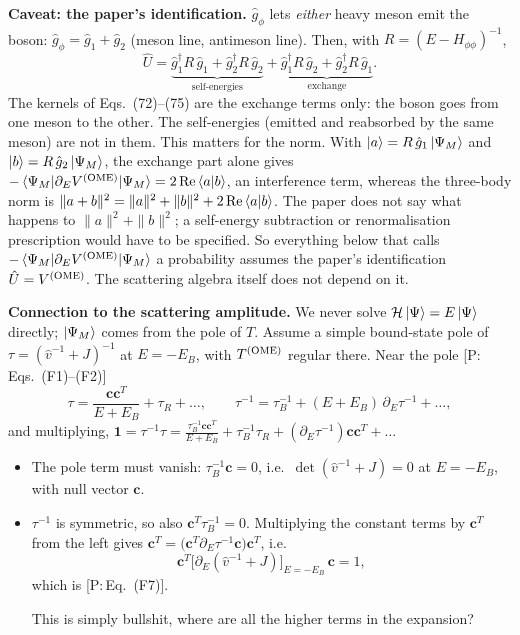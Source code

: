 \documentclass[11pt,a4paper]{article}
\newcommand{\tagP}[1]{\textcolor{blue!65!black}{\textsf{\small[P:\,#1]}}}
\renewcommand{\VOME}{V^{\rm (OME)}}
\renewcommand{\TOME}{T^{\rm (OME)}}
\newenvironment{aiadd}{\par}{\par}
\begin{document}
\begin{aiadd}
	\textbf{Caveat: the paper's identification.} $\hat g_\phi$ lets \emph{either} heavy meson emit the boson: $\hat g_\phi=\hat g_1+\hat g_2$ (meson line, antimeson line). Then, with $R=(E-H_{\phi\phi})^{-1}$,
	\[
		\hat U=\underbrace{\hat g_1^\dagger R\,\hat g_1+\hat g_2^\dagger R\,\hat g_2}_{\text{self-energies}}+\underbrace{\hat g_1^\dagger R\,\hat g_2+\hat g_2^\dagger R\,\hat g_1}_{\text{exchange}} .
	\]
	The kernels of Eqs.~(72)--(75) are the exchange terms only: the boson goes from one meson to the other. The self-energies (emitted and reabsorbed by the same meson) are not in them. This matters for the norm. With $\ket a=R\,\hat g_1\ket{\Psi_M}$ and $\ket b=R\,\hat g_2\ket{\Psi_M}$, the exchange part alone gives $-\braket{\Psi_M|\partial_E\VOME|\Psi_M}=2\,\mathrm{Re}\braket{a|b}$, an interference term, whereas the three-body norm is $\|a+b\|^2=\|a\|^2+\|b\|^2+2\,\mathrm{Re}\braket{a|b}$. The paper does not say what happens to $\|a\|^2+\|b\|^2$; a self-energy subtraction or renormalisation prescription would have to be specified. So everything below that calls $-\braket{\Psi_M|\partial_E\VOME|\Psi_M}$ a probability assumes the paper's identification $\hat U=\VOME$. The scattering algebra itself does not depend on it.

	\textbf{Connection to the scattering amplitude.} We never solve $\mathcal H\ket\Psi=E\ket\Psi$ directly; $\ket{\Psi_M}$ comes from the pole of $T$. Assume a simple bound-state pole of $\tau=(\hat v^{-1}+J)^{-1}$ at $E=-E_B$, with $\TOME$ regular there. Near the pole \tagP{Eqs.~(F1)--(F2)}
	\[
		\tau=\frac{\bm c\bm c^T}{E+E_B}+\tau_R+\dots,\qquad
		\tau^{-1}=\tau_B^{-1}+(E+E_B)\,\partial_E\tau^{-1}+\dots,
	\]
	and multiplying, $\bm 1=\tau^{-1}\tau=\frac{\tau_B^{-1}\bm c\bm c^T}{E+E_B}+\tau_B^{-1}\tau_R+(\partial_E\tau^{-1})\bm c\bm c^T+\dots$
	\begin{itemize}
		\item The pole term must vanish: $\tau_B^{-1}\bm c=0$, i.e.\ $\det(\hat v^{-1}+J)=0$ at $E=-E_B$, with null vector $\bm c$.
		\item $\tau^{-1}$ is symmetric, so also $\bm c^T\tau_B^{-1}=0$. Multiplying the constant terms by $\bm c^T$ from the left gives $\bm c^T=\big(\bm c^T\partial_E\tau^{-1}\bm c\big)\bm c^T$, i.e.
		      \[
			      \bm c^T\big[\partial_E(\hat v^{-1}+J)\big]_{E=-E_B}\,\bm c=1,
		      \]
		      which is \tagP{Eq.~(F7)}.

		      This is simply bullshit, where are all the higher terms in the expansion?
	\end{itemize}


\end{aiadd}
\end{document}
